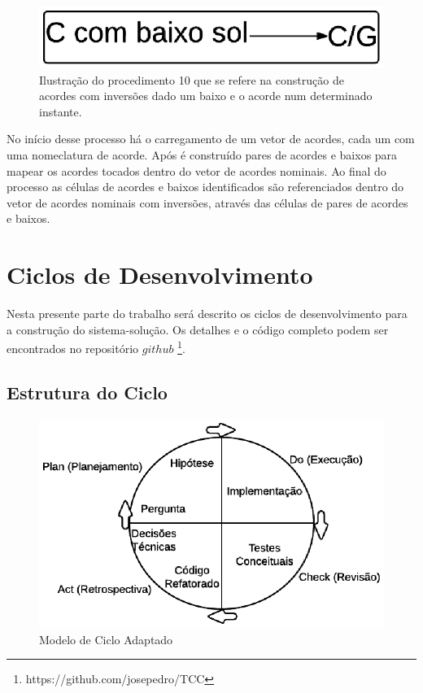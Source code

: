 \begin{figure}[h] 
  \centering
    \includegraphics[keepaspectratio=true, scale=0.55]{figuras/procedimento_10}
    \caption{Ilustração do procedimento 10 que se refere na construção de acordes com inversões dado um baixo e o acorde num determinado instante.}
    \label{fig:procedimento_10}
\end{figure}

No início desse processo há o carregamento de um vetor de acordes, cada um com uma nomeclatura de acorde. Após é construído pares de acordes e baixos para mapear os acordes tocados dentro do vetor de acordes nominais. Ao final do processo as células de acordes e baixos identificados são referenciados dentro do vetor de acordes nominais com inversões, através das células de pares de acordes e baixos.



\section {Ciclos de Desenvolvimento}
 
Nesta presente parte do trabalho será descrito os ciclos de desenvolvimento para a construção do sistema-solução. Os detalhes e o código completo podem ser encontrados no repositório $github$ \footnote{https://github.com/josepedro/TCC}.

\subsection{Estrutura do Ciclo}

\begin{figure}[h] 
  \centering
    \includegraphics[keepaspectratio=true, scale=0.85]{figuras/ciclo_desenvolvimento}
    \caption{Modelo de Ciclo Adaptado}
\end{figure}

